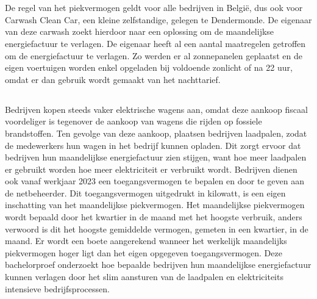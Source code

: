 
\chapter{}%
\label{ch:inleiding}

De regel van het piekvermogen geldt voor alle bedrijven in België, dus ook voor Carwash Clean Car, een kleine zelfstandige, gelegen te Dendermonde. De eigenaar van deze carwash zoekt hierdoor naar een oplossing om de maandelijkse energiefactuur te verlagen. De eigenaar heeft al een aantal maatregelen getroffen om de energiefactuur te verlagen. Zo werden er al zonnepanelen geplaatst en de eigen voertuigen worden enkel opgeladen bij voldoende zonlicht of na 22 uur, omdat er dan gebruik wordt gemaakt van het nachttarief.

\pagebreak

\section{}%
\label{sec:probleemstelling}

Bedrijven kopen steeds vaker elektrische wagens aan, omdat deze aankoop fiscaal voordeliger is tegenover de aankoop van wagens die rijden op fossiele brandstoffen. Ten gevolge van deze aankoop, plaatsen bedrijven laadpalen, zodat de medewerkers hun wagen in het bedrijf kunnen opladen. Dit zorgt ervoor dat bedrijven hun maandelijkse energiefactuur zien stijgen, want hoe meer laadpalen er gebruikt worden hoe meer elektriciteit er verbruikt wordt. Bedrijven dienen ook vanaf werkjaar 2023 een toegangsvermogen te bepalen en door te geven aan de netbeheerder. Dit toegangsvermogen uitgedrukt in kilowatt, is een eigen inschatting van het maandelijkse piekvermogen. Het maandelijkse piekvermogen wordt bepaald door het kwartier in de maand met het hoogste verbruik, anders verwoord is dit het hoogste gemiddelde vermogen, gemeten in een kwartier, in de maand. Er wordt een boete aangerekend wanneer het werkelijk maandelijks piekvermogen hoger ligt dan het eigen opgegeven toegangsvermogen. Deze bachelorproef onderzoekt hoe bepaalde bedrijven hun maandelijkse energiefactuur kunnen verlagen door het slim aansturen van de laadpalen en elektriciteits intensieve bedrijfsprocessen.

